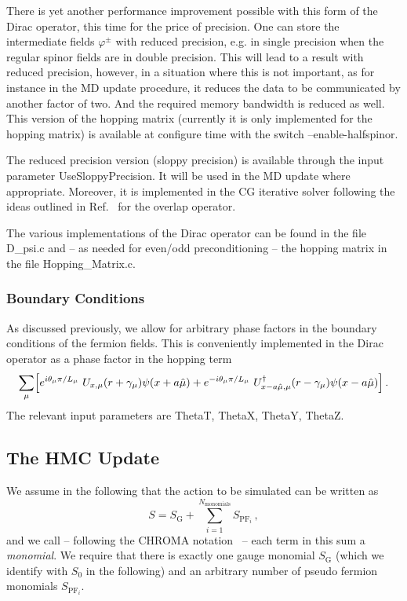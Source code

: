 There is yet another performance improvement possible with this form
of the Dirac operator, this time for the price of precision. One can
store the intermediate fields $\varphi^\pm$ with reduced precision,
e.g. in single precision when the regular spinor fields are in double
precision. This will lead to a result with reduced precision, however,
in a situation where this is not important, as for instance in the MD
update procedure, it reduces the data to be communicated by another
factor of two. And the required memory bandwidth is reduced as well.
This version of the hopping matrix (currently it is only implemented
for the hopping matrix) is available at configure time with the switch
{\ttfamily --enable-halfspinor}. 

The reduced precision version (sloppy precision) is available through
the input parameter {\ttfamily UseSloppyPrecision}. It will be used in
the MD update where appropriate. Moreover, it is implemented in the CG
iterative solver following the ideas outlined in
Ref.~\cite{Chiarappa:2006hz} for the overlap operator.

The various implementations of the Dirac operator can be found in the
file {\ttfamily D\_psi.c} and -- as needed for even/odd
preconditioning -- the hopping matrix in the file {\ttfamily
  Hopping\_Matrix.c}.


\subsubsection{Boundary Conditions}

As discussed previously, we allow for arbitrary phase factors in the
boundary conditions of the fermion fields. This is conveniently
implemented in the Dirac operator as a phase factor in the hopping
term
\[
\sum_\mu \Bigl[
    e^{i\theta_\mu \pi/L_\mu}\ U_{x,\mu}(r+\gamma_\mu)
    \psi(x+a\hat\mu)  + e^{-i\theta_\mu \pi/L_\mu}\
    U^\dagger_{x-a\hat\mu,\mu} 
    (r-\gamma_\mu)\psi(x-a\hat\mu)\Bigr]\, .
\]
The relevant input parameters are {\ttfamily ThetaT}, {\ttfamily
  ThetaX}, {\ttfamily ThetaY}, {\ttfamily ThetaZ}. 



\subsection{The HMC Update}

We assume in the following that the action to be simulated can be
written as 
\[
S = S_\mathrm{G} + \sum_{i=1}^{N_\mathrm{monomials}} S_{\mathrm{PF}_i}\, ,
\]
and we call -- following the CHROMA notation~\cite{Edwards:2004sx} -- each
term in this sum a \emph{monomial}. We require that there is exactly one
gauge monomial $S_\mathrm{G}$ (which we identify with $S_0$ in the
following) and an arbitrary number of pseudo
fermion monomials $S_{\mathrm{PF}_i}$.

